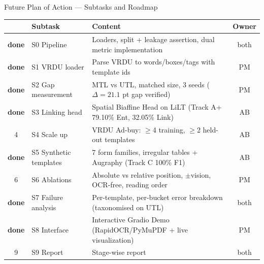 \documentclass[aspectratio=169, 11pt]{beamer}
\renewcommand{\arraystretch}{1.15}
\begin{document}
\begin{frame}{Future Plan of Action — Subtasks and Roadmap}
  \renewcommand{\arraystretch}{1.05}
  \scriptsize
  \centering
  \begin{tabular}{@{}clp{9.0cm}c@{}}
    \toprule
    & \textbf{Subtask} & \textbf{Content} & \textbf{Owner}\\
    \midrule
    \textcolor{good}{\textbf{done}} & S0 Pipeline & Loaders, split + leakage assertion, dual metric implementation & both\\
    \textcolor{good}{\textbf{done}} & S1 VRDU loader & Parse VRDU to words/boxes/tags with template ids & PM\\
    \textcolor{good}{\textbf{done}} & S2 Gap measurement & MTL vs UTL, matched size, 3 seeds ($\Delta = 21.1$ pt gap verified) & PM\\
    \textcolor{good}{\textbf{done}} & S3 Linking head & Spatial Biaffine Head on LiLT (Track A+ 79.10\% Ent, 32.05\% Link) & AB\\
    4 & S4 Scale up & VRDU Ad-buy: $\geq$4 training, $\geq$2 held-out templates & AB\\
    \textcolor{good}{\textbf{done}} & S5 Synthetic templates & 7 form families, irregular tables + Augraphy (Track C 100\% F1) & AB\\
    6 & S6 Ablations & Absolute vs relative position, $\pm$vision, OCR-free, reading order & PM\\
    \textcolor{good}{\textbf{done}} & S7 Failure analysis & Per-template, per-bucket error breakdown (taxonomised on UTL) & both\\
    \textcolor{good}{\textbf{done}} & S8 Interface & Interactive Gradio Demo (RapidOCR/PyMuPDF + live visualization) & PM\\
    9 & S9 Report & Stage-wise report & both\\
    \bottomrule
  \end{tabular}
\end{frame}
\end{document}
